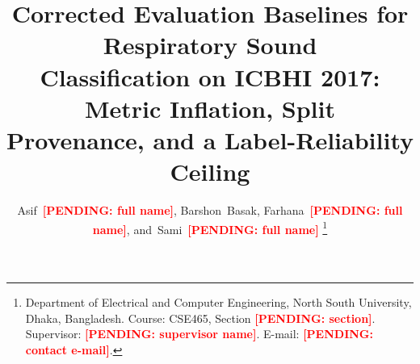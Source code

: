 \documentclass[journal,onecolumn]{IEEEtran}
\newcommand{\pending}[1]{\textcolor{red}{\textbf{[PENDING: #1]}}}
\begin{document}
\title{Corrected Evaluation Baselines for Respiratory Sound\\
Classification on ICBHI 2017: Metric Inflation, Split\\
Provenance, and a Label-Reliability Ceiling}

\author{Asif~\pending{full name},
        Barshon~Basak,
        Farhana~\pending{full name},
        and~Sami~\pending{full name}%
\thanks{Department of Electrical and Computer Engineering, North South
University, Dhaka, Bangladesh. Course: CSE465, Section \pending{section}.
Supervisor: \pending{supervisor name}. E-mail: \pending{contact e-mail}.}}

\maketitle
\end{document}
